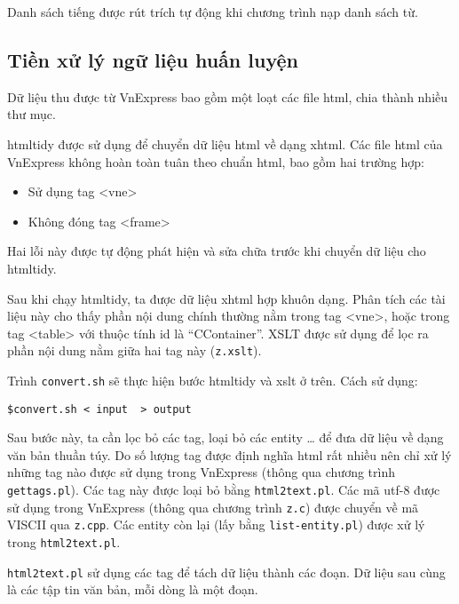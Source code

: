 \documentclass[a4paper,oneside]{book} %
\begin{document}
Danh sách tiếng được rút trích tự động khi chương trình nạp danh sách
từ.



\subsection{Tiền xử lý ngữ liệu huấn luyện}
\label{sec:training-data-preprocessing}

Dữ liệu thu được từ VnExpress bao gồm một loạt các file html, chia
thành nhiều thư mục.

htmltidy được sử dụng để chuyển dữ liệu html về dạng xhtml. Các file
html của VnExpress không hoàn toàn tuân theo chuẩn html, bao gồm hai
trường hợp:

\begin{itemize}
\item Sử dụng tag <vne>
\item Không đóng tag <frame>
\end{itemize}

Hai lỗi này được tự động phát hiện và sửa chữa trước khi chuyển dữ
liệu cho htmltidy.

Sau khi chạy htmltidy, ta được dữ liệu xhtml hợp khuôn dạng. Phân tích
các tài liệu này cho thấy phần nội dung chính thường nằm trong tag
<vne>, hoặc trong tag <table> với thuộc tính id là
``CContainer''. XSLT được sử dụng để lọc ra phần nội dung nằm giữa hai
tag này (\verb#z.xslt#).

Trình \verb#convert.sh# sẽ thực hiện bước htmltidy và xslt ở trên. Cách sử
dụng:
\begin{verbatim}
$convert.sh < input  > output
\end{verbatim}

Sau bước này, ta cần lọc bỏ các tag, loại bỏ các entity \ldots{} để
đưa dữ liệu về dạng văn bản thuần túy. Do số lượng tag được định nghĩa
html rất nhiều nên chỉ xử lý những tag nào được sử dụng trong
VnExpress (thông qua chương trình \verb#gettags.pl#). Các tag này được loại
bỏ bằng \verb#html2text.pl#. Các mã utf-8 được sử dụng trong
VnExpress (thông qua chương trình \verb#z.c#) được chuyển về mã VISCII
qua \verb#z.cpp#. Các entity còn lại (lấy bằng \verb#list-entity.pl#)
được xử lý trong \verb#html2text.pl#.

\verb#html2text.pl# sử dụng các tag để tách dữ liệu thành các đoạn. Dữ
liệu sau cùng là các tập tin văn bản, mỗi dòng là một đoạn.
\end{document}
